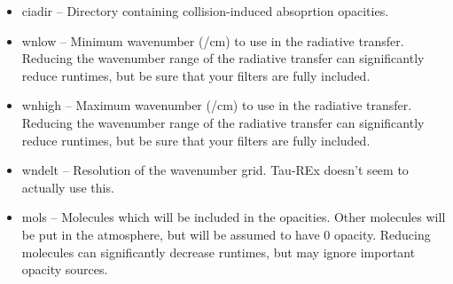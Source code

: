\documentclass[12pt]{article}
\begin{document}
\begin{itemize}
\begin{itemize}
    \item ciadir -- Directory containing collision-induced absoprtion
      opacities.

    \item wnlow -- Minimum wavenumber (/cm) to use in the radiative transfer.
      Reducing the wavenumber range of the radiative transfer can significantly
      reduce runtimes, but be sure that your filters are fully included.

    \item wnhigh -- Maximum wavenumber (/cm) to use in the radiative transfer.
      Reducing the wavenumber range of the radiative transfer can significantly
      reduce runtimes, but be sure that your filters are fully included.

    \item wndelt -- Resolution of the wavenumber grid. Tau-REx doesn't seem
      to actually use this.

    \item mols -- Molecules which will be included in the opacities. Other
      molecules will be put in the atmosphere, but will be assumed to have
      0 opacity. Reducing molecules can significantly decrease runtimes,
      but may ignore important opacity sources.
  \end{itemize}
\end{itemize}
\end{document}
